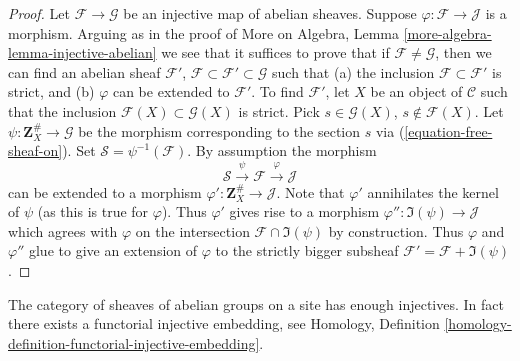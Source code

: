 \begin{proof}
Let $\mathcal{F} \to \mathcal{G}$ be an injective map
of abelian sheaves. Suppose $\varphi : \mathcal{F} \to \mathcal{J}$
is a morphism. Arguing as in the proof of
More on Algebra, Lemma \ref{more-algebra-lemma-injective-abelian}
we see that it suffices
to prove that if $\mathcal{F} \not = \mathcal{G}$, then we
can find an abelian sheaf $\mathcal{F}'$,
$\mathcal{F} \subset \mathcal{F}' \subset \mathcal{G}$
such that (a) the inclusion $\mathcal{F} \subset \mathcal{F}'$ is strict,
and (b) $\varphi$ can be extended to $\mathcal{F}'$.
To find $\mathcal{F}'$, let $X$ be an object of $\mathcal{C}$ such
that the inclusion $\mathcal{F}(X) \subset \mathcal{G}(X)$
is strict. Pick $s \in \mathcal{G}(X)$, $s \not \in \mathcal{F}(X)$.
Let $\psi : \mathbf{Z}_X^\# \to \mathcal{G}$ be the morphism corresponding
to the section $s$ via (\ref{equation-free-sheaf-on}). Set
$\mathcal{S} = \psi^{-1}(\mathcal{F})$. By assumption the morphism
$$
\mathcal{S} \xrightarrow{\psi} \mathcal{F} \xrightarrow{\varphi} \mathcal{J}
$$
can be extended to a morphism $\varphi' : \mathbf{Z}_X^\# \to \mathcal{J}$.
Note that $\varphi'$ annihilates the kernel of $\psi$ (as this is true
for $\varphi$). Thus $\varphi'$ gives rise to a morphism
$\varphi'' : \Im(\psi) \to \mathcal{J}$
which agrees with $\varphi$ on the intersection
$\mathcal{F} \cap \Im(\psi)$ by construction.
Thus $\varphi$ and $\varphi''$ glue to give an extension
of $\varphi$ to the strictly bigger subsheaf
$\mathcal{F}' = \mathcal{F} + \Im(\psi)$.
\end{proof}

\begin{theorem}
\label{theorem-sheaves-injectives}
The category of sheaves of abelian groups on a
site has enough injectives. In fact there exists
a functorial injective embedding, see
Homology, Definition \ref{homology-definition-functorial-injective-embedding}.
\end{theorem}

